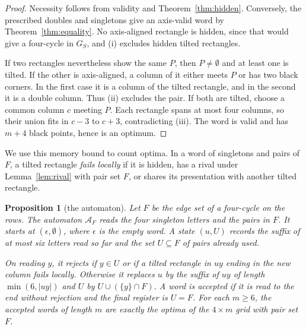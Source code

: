 \documentclass[12pt]{article}
\theoremstyle{plain}
\newtheorem{proposition}[theorem]{Proposition}
\theoremstyle{definition}
\theoremstyle{remark}
\begin{document}
\begin{proof}
Necessity follows from validity and Theorem~\ref{thm:hidden}.
Conversely, the prescribed doubles and singletons give an axis-valid
word by Theorem~\ref{thm:equality}. No axis-aligned rectangle is hidden,
since that would give a four-cycle in $G_S$, and (i) excludes hidden
tilted rectangles.

If two rectangles nevertheless show the same $P$, then
$P\ne\emptyset$ and at least one is tilted. If the other is
axis-aligned, a column of it either meets $P$ or has two black corners.
In the first case it is a column of the tilted rectangle, and in the
second it is a double column. Thus (ii) excludes the pair.
If both are tilted, choose a common column $c$ meeting $P$.
Each rectangle spans at most four columns, so their union fits in
$c-3$ to $c+3$, contradicting (iii). The word is valid and has
$m+4$ black points, hence is an optimum.
\end{proof}

We use this memory bound to count optima. In a word of singletons and pairs
of $F$, a tilted rectangle \emph{fails locally} if it is hidden, has a rival
under Lemma~\ref{lem:rival} with pair set $F$, or shares its presentation
with another tilted rectangle.

\begin{proposition}[the automaton]\label{prop:fourautomaton}
Let $F$ be the edge set of a four-cycle on the rows. The automaton $\mathcal A_F$ reads
the four singleton letters and the pairs in $F$. It starts at $(\epsilon,\emptyset)$,
where $\epsilon$ is the empty word. A state $(u,U)$ records the suffix of at most six
letters read so far and the set $U\subseteq F$ of pairs already used.

On reading $y$, it rejects if $y\in U$ or if a tilted rectangle in $uy$ ending in the
new column fails locally. Otherwise it replaces $u$ by the suffix of $uy$ of length
$\min(6,|uy|)$ and $U$ by $U\cup(\{y\}\cap F)$. A word is accepted if it is read to the end
without rejection and the final register is $U=F$. For each $m\ge6$, the accepted words
of length $m$ are exactly the optima of the $4\times m$ grid with pair set $F$.
\end{proposition}
\end{document}
